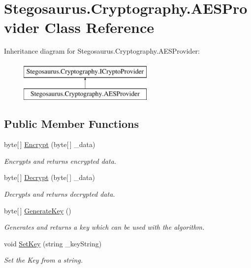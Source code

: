 \hypertarget{class_stegosaurus_1_1_cryptography_1_1_a_e_s_provider}{}\section{Stegosaurus.\+Cryptography.\+A\+E\+S\+Provider Class Reference}
\label{class_stegosaurus_1_1_cryptography_1_1_a_e_s_provider}
Inheritance diagram for Stegosaurus.\+Cryptography.\+A\+E\+S\+Provider\+:\begin{figure}[H]
\begin{center}
\leavevmode
\includegraphics[height=2.000000cm]{class_stegosaurus_1_1_cryptography_1_1_a_e_s_provider}
\end{center}
\end{figure}
\subsection*{Public Member Functions}
\begin{DoxyCompactItemize}
\item 
byte\mbox{[}$\,$\mbox{]} \hyperlink{class_stegosaurus_1_1_cryptography_1_1_a_e_s_provider_a81deb5da864b25f93810afbd8fc6449d}{Encrypt} (byte\mbox{[}$\,$\mbox{]} \+\_\+data)
\begin{DoxyCompactList}\small\item\em Encrypts and returns encrypted data. \end{DoxyCompactList}\item 
byte\mbox{[}$\,$\mbox{]} \hyperlink{class_stegosaurus_1_1_cryptography_1_1_a_e_s_provider_a7f9c88ceae0fb598224b04953ee70e0a}{Decrypt} (byte\mbox{[}$\,$\mbox{]} \+\_\+data)
\begin{DoxyCompactList}\small\item\em Decrypts and returns decrypted data. \end{DoxyCompactList}\item 
byte\mbox{[}$\,$\mbox{]} \hyperlink{class_stegosaurus_1_1_cryptography_1_1_a_e_s_provider_a0e14ad61f9e6bb0555f159e2008153ee}{Generate\+Key} ()
\begin{DoxyCompactList}\small\item\em Generates and returns a key which can be used with the algorithm. \end{DoxyCompactList}\item 
void \hyperlink{class_stegosaurus_1_1_cryptography_1_1_a_e_s_provider_ab9119737779ce4aea6c8c7e6c4725923}{Set\+Key} (string \+\_\+key\+String)
\begin{DoxyCompactList}\small\item\em Set the Key from a string. \end{DoxyCompactList}\end{DoxyCompactItemize}
